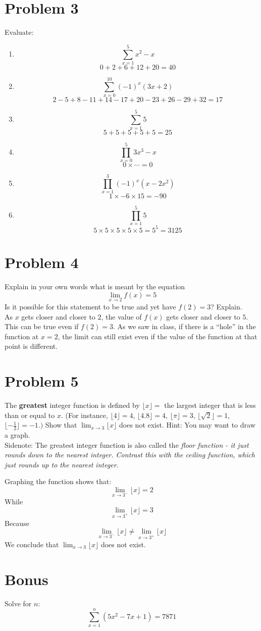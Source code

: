 \documentclass[11pt]{article}
\theoremstyle{definition}
\theoremstyle{remark}
\begin{document}
\section*{Problem 3}
Evaluate:
\begin{enumerate}
\item $$\sum_{x=1}^{5}x^2-x$$
{\color{red} $$0 + 2 + 6 + 12 + 20 = 40 $$}
\item $$\sum_{x=0}^{10}(-1)^{x} (3x + 2) $$
{\color{red} $$2 - 5 + 8 - 11 +14 - 17 + 20 -23 +26 - 29 + 32 = 17$$}
\item $$\sum_{x=1}^{5} 5$$
{\color{red} $$ 5 + 5+5+5+5 = 25$$}
\item $$\prod_{x=0}^{5}3x^3-x$$
{\color{red} $$0\times \cdots = 0$$}
\item $$\prod_{x=1}^{3}(-1)^{x} (x - 2x^2) $$
{\color{red} $$1 \times -6 \times 15 = -90 $$}
\item $$\prod_{x=1}^{5} 5$$
{\color{red} $$5\times5\times5\times5\times5 = 5^5 = 3125$$}

\end{enumerate}

\section*{Problem 4}
Explain in your own words what is meant by the equation
\[\lim_{x\to 2} f(x) = 5\]
Is it possible for this statement to be true and yet have $f(2) = 3$? Explain.\\[5pt]

{\color{red} As $x$ gets closer and closer to $2$, the value of $f(x)$ gets closer and closer to $5$. This can be true even if $f(2) =3$. As we saw in class, if there is a ``hole'' in the function at $x=2$, the limit can still exist even if the value of the function at that point is different.}

\section*{Problem 5}
The \textbf{greatest} integer function is defined by $\lfloor x \rfloor=$ the largest integer that is less than or equal to $x$. (For instance, $\lfloor 4 \rfloor=4$, $\lfloor 4.8 \rfloor=4$, $\lfloor \pi \rfloor=3$, $\lfloor \sqrt{2} \rfloor=1$, $\lfloor -\frac{1}{2} \rfloor= -1.)$ Show that $\lim_{x \to 3} \lfloor x \rfloor $ does not exist. Hint: You may want to draw a graph. \\[5pt]
Sidenote: The greatest integer function is also called the \em floor \em function - it just rounds down to the nearest integer. Contrast this with the \em ceiling \em function, which just rounds up to the nearest integer. 

{\color{red} Graphing the function shows that:
$$\lim_{x\to3^-}\lfloor x \rfloor = 2$$
While
$$\lim_{x\to3^+}\lfloor x \rfloor = 3$$
Because
$$\lim_{x\to3^-}\lfloor x \rfloor \neq \lim_{x\to3^+}\lfloor x \rfloor$$
We conclude that $\lim_{x\to3} \lfloor x \rfloor$ does not exist.

}

\section*{Bonus}
Solve for $n$:
$$\sum_{x=1}^{n} (5x^2 -7x + 1) = 7871 $$
\end{document}
